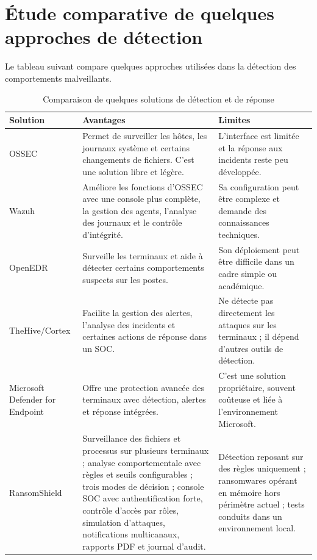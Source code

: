 \section{Étude comparative de quelques approches de détection}

Le tableau suivant compare quelques approches utilisées dans la détection des comportements malveillants.



\begin{table}[htbp]
\centering
\caption{Comparaison de quelques solutions de détection et de réponse}
\label{tab:comparaison-solutions}
\small
\renewcommand{\arraystretch}{1.3}
\begin{tabularx}{\textwidth}{|p{3cm}|X|X|}
\hline
\textbf{Solution} & \textbf{Avantages} & \textbf{Limites} \\
\hline
OSSEC & Permet de surveiller les hôtes, les journaux système et certains changements de fichiers. C'est une solution libre et légère. & L'interface est limitée et la réponse aux incidents reste peu développée. \\
\hline
Wazuh & Améliore les fonctions d'OSSEC avec une console plus complète, la gestion des agents, l'analyse des journaux et le contrôle d'intégrité. & Sa configuration peut être complexe et demande des connaissances techniques. \\
\hline
OpenEDR & Surveille les terminaux et aide à détecter certains comportements suspects sur les postes. & Son déploiement peut être difficile dans un cadre simple ou académique. \\
\hline
TheHive/Cortex & Facilite la gestion des alertes, l'analyse des incidents et certaines actions de réponse dans un SOC. & Ne détecte pas directement les attaques sur les terminaux ; il dépend d'autres outils de détection. \\
\hline
Microsoft Defender for Endpoint & Offre une protection avancée des terminaux avec détection, alertes et réponse intégrées. & C'est une solution propriétaire, souvent coûteuse et liée à l'environnement Microsoft. \\
\hline
RansomShield & Surveillance des fichiers et processus sur plusieurs terminaux ; analyse comportementale avec règles et seuils configurables ; trois modes de décision ; console SOC avec authentification forte, contrôle d'accès par rôles, simulation d'attaques, notifications multicanaux, rapports PDF et journal d'audit. & Détection reposant sur des règles uniquement ; ransomwares opérant en mémoire hors périmètre actuel ; tests conduits dans un environnement local. \\
\hline
\end{tabularx}
\end{table}



